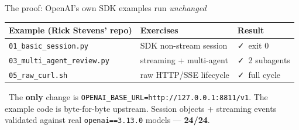 \begin{frame}{The proof: OpenAI's own SDK examples run \emph{unchanged}}
  \small
  \begin{center}
  \renewcommand{\arraystretch}{1.3}
  \begin{tabular}{@{}l l l@{}}
    \toprule
    \textbf{Example (Rick Stevens' repo)} & \textbf{Exercises} & \textbf{Result} \\
    \midrule
    \texttt{01\_basic\_session.py} & SDK non-stream session & \textcolor{accentteal}{\faCheck\ exit 0} \\
    \texttt{03\_multi\_agent\_review.py} & streaming + multi-agent & \textcolor{accentteal}{\faCheck\ 2 subagents} \\
    \texttt{05\_raw\_curl.sh} & raw HTTP/SSE lifecycle & \textcolor{accentteal}{\faCheck\ full cycle} \\
    \bottomrule
  \end{tabular}
  \end{center}
  \vspace{8pt}
  \begin{calloutbox}[accentteal]
    \small\faKey\ The \textbf{only} change is
    \texttt{OPENAI\_BASE\_URL=http://127.0.0.1:8811/v1}. The example code is
    byte-for-byte upstream. Session objects + streaming events validated
    against real \texttt{openai==3.13.0} models --- \textbf{24/24}.
  \end{calloutbox}
\end{frame}

